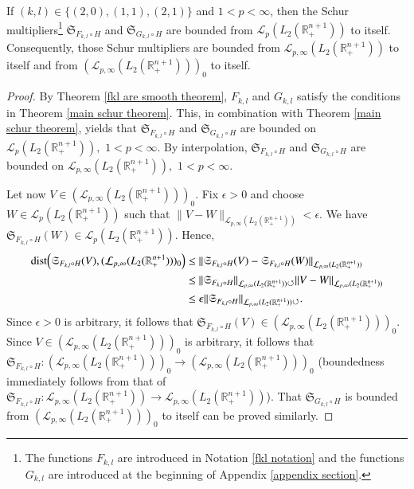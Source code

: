 \documentclass[12pt]{amsart}
\begin{document}
\begin{proposition}\label{fkl schur lemma} If $(k,l)\in\{(2,0),(1,1),(2,1)\}$ and $1<p<\infty$, then the Schur multipliers\footnote{The functions $F_{k,l}$ are introduced in Notation \ref{fkl notation} and the functions $G_{k,l}$ are introduced at the beginning of Appendix \ref{appendix section}.} $\mathfrak{S}_{F_{k,l}\circ H}$ and $\mathfrak{S}_{G_{k,l}\circ H}$ are bounded from $\mathcal{L}_p(L_2(\mathbb{R}^{n+1}_+))$ to itself. Consequently, those Schur multipliers are bounded from $\mathcal{L}_{p,\infty}(L_2(\mathbb{R}^{n+1}_+))$ to itself and from $(\mathcal{L}_{p,\infty}(L_2(\mathbb{R}^{n+1}_+)))_0$ to itself.
\end{proposition}
\begin{proof} By Theorem \ref{fkl are smooth theorem}, $F_{k,l}$ and $G_{k,l}$ satisfy the conditions in Theorem \ref{main schur theorem}. This, in combination with Theorem \ref{main schur theorem}, yields that $\mathfrak{S}_{F_{k,l}\circ H}$ and $\mathfrak{S}_{G_{k,l}\circ H}$ are bounded on $\mathcal{L}_p(L_2(\mathbb{R}^{n+1}_+)),$ $1<p<\infty.$ By interpolation, $\mathfrak{S}_{F_{k,l}\circ H}$ and $\mathfrak{S}_{G_{k,l}\circ H}$ are bounded on $\mathcal{L}_{p,\infty}(L_2(\mathbb{R}^{n+1}_+)),$ $1<p<\infty.$

{\color{blue} Let now $V\in(\mathcal{L}_{p,\infty}(L_2(\mathbb{R}^{n+1}_+)))_0.$ Fix $\epsilon>0$ and choose $W\in\mathcal{L}_p(L_2(\mathbb{R}^{n+1}_+))$ such that $\|V-W\|_{\mathcal{L}_{p,\infty}(L_2(\mathbb{R}^{n+1}_+))}<\epsilon.$ We have $\mathfrak{S}_{F_{k,l}\circ H}(W)\in \mathcal{L}_p(L_2(\mathbb{R}^{n+1}_+)).$ Hence,
\begin{align*}
{\rm dist}\Big(\mathfrak{S}_{F_{k,l}\circ H}(V),(\mathcal{L}_{p,\infty}(L_2(\mathbb{R}^{n+1}_+)))_0\Big)&\leq \|\mathfrak{S}_{F_{k,l}\circ H}(V)-\mathfrak{S}_{F_{k,l}\circ H}(W)\|_{\mathcal{L}_{p,\infty}(L_2(\mathbb{R}_+^{n+1}))}\\
&\leq \|\mathfrak{S}_{F_{k,l}\circ H}\|_{\mathcal{L}_{p,\infty}(L_2(\mathbb{R}_+^{n+1}))\circlearrowleft}\|V-W\|_{\mathcal{L}_{p,\infty}(L_2(\mathbb{R}_+^{n+1}))}\\
&\leq\epsilon\|\mathfrak{S}_{F_{k,l}\circ H}\|_{\mathcal{L}_{p,\infty}(L_2(\mathbb{R}_+^{n+1}))\circlearrowleft}.
\end{align*}
Since $\epsilon>0$ is arbitrary, it follows that $\mathfrak{S}_{F_{k,l}\circ H}(V)\in (\mathcal{L}_{p,\infty}(L_2(\mathbb{R}^{n+1}_+)))_0.$ Since $V\in(\mathcal{L}_{p,\infty}(L_2(\mathbb{R}^{n+1}_+)))_0$ is arbitrary, it follows that $\mathfrak{S}_{F_{k,l}\circ H}:(\mathcal{L}_{p,\infty}(L_2(\mathbb{R}^{n+1}_+)))_0\to (\mathcal{L}_{p,\infty}(L_2(\mathbb{R}^{n+1}_+)))_0$ (boundedness immediately follows from that of $\mathfrak{S}_{F_{k,l}\circ H}:\mathcal{L}_{p,\infty}(L_2(\mathbb{R}^{n+1}_+))\to \mathcal{L}_{p,\infty}(L_2(\mathbb{R}^{n+1}_+))$). That $\mathfrak{S}_{G_{k,l}\circ H}$ is bounded from $(\mathcal{L}_{p,\infty}(L_2(\mathbb{R}^{n+1}_+)))_0$ to itself can be proved similarly.}	
\end{proof}
\end{document}
